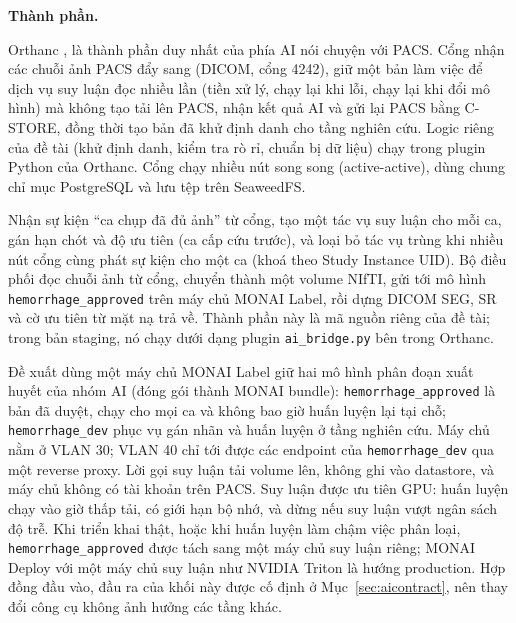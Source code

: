 \textbf{Thành phần.}
\begin{description}[leftmargin=3.4cm,style=nextline]
\item[Cổng trung gian] Orthanc \cite{jodogne2018orthanc}, là thành phần duy nhất của
      phía AI nói chuyện với PACS. Cổng nhận các chuỗi ảnh PACS đẩy sang (DICOM, cổng
      4242), giữ một bản làm việc để dịch vụ suy luận đọc nhiều lần (tiền xử lý, chạy lại
      khi lỗi, chạy lại khi đổi mô hình) mà không tạo tải lên PACS, nhận kết quả AI và gửi
      lại PACS bằng C-STORE, đồng thời tạo bản đã khử định danh cho tầng nghiên cứu. Logic
      riêng của đề tài (khử định danh, kiểm tra rò rỉ, chuẩn bị dữ liệu) chạy trong plugin
      Python của Orthanc. Cổng chạy nhiều nút song song (active-active), dùng chung chỉ
      mục PostgreSQL và lưu tệp trên SeaweedFS.
\item[Bộ điều phối tác vụ] Nhận sự kiện ``ca chụp đã đủ ảnh'' từ cổng, tạo một tác vụ
      suy luận cho mỗi ca, gán hạn chót và độ ưu tiên (ca cấp cứu trước), và loại bỏ tác
      vụ trùng khi nhiều nút cổng cùng phát sự kiện cho một ca (khoá theo Study Instance
      UID). Bộ điều phối đọc chuỗi ảnh từ cổng, chuyển thành một volume NIfTI, gửi tới
      mô hình \texttt{hemorrhage\_approved} trên máy chủ MONAI Label, rồi dựng DICOM SEG, SR và cờ ưu tiên từ mặt nạ trả
      về. Thành phần này là mã nguồn riêng của đề tài; trong bản staging, nó chạy dưới
      dạng plugin \texttt{ai\_bridge.py} bên trong Orthanc.
\item[Dịch vụ suy luận AI] Đề xuất dùng một máy chủ MONAI Label \cite{monailabel}
      giữ hai mô hình phân đoạn xuất huyết của nhóm AI (đóng gói thành MONAI bundle):
      \texttt{hemorrhage\_approved} là bản đã duyệt, chạy cho mọi ca và không bao giờ huấn luyện
      lại tại chỗ; \texttt{hemorrhage\_dev} phục vụ gán nhãn và huấn luyện ở tầng nghiên cứu.
      Máy chủ nằm ở VLAN 30; VLAN 40 chỉ tới được các endpoint của \texttt{hemorrhage\_dev} qua
      một reverse proxy. Lời gọi suy luận tải volume lên, không ghi vào datastore, và máy
      chủ không có tài khoản trên PACS. Suy luận được ưu tiên GPU: huấn luyện chạy vào giờ
      thấp tải, có giới hạn bộ nhớ, và dừng nếu suy luận vượt ngân sách độ trễ. Khi triển
      khai thật, hoặc khi huấn luyện làm chậm việc phân loại, \texttt{hemorrhage\_approved} được
      tách sang một máy chủ suy luận riêng; MONAI Deploy với một máy chủ suy luận như
      NVIDIA Triton là hướng production. Hợp đồng đầu vào, đầu ra của khối này được cố định ở
      Mục~\ref{sec:aicontract}, nên thay đổi công cụ không ảnh hưởng các tầng khác.
\end{description}

